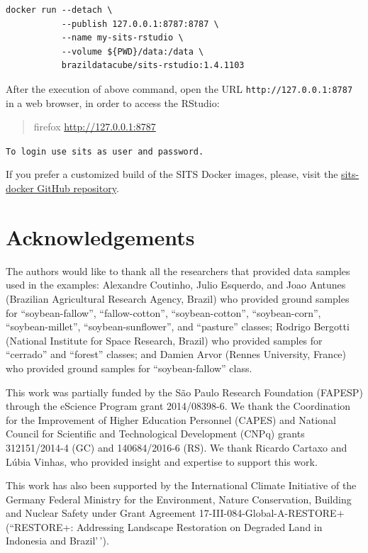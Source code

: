 \documentclass[a4paper,]{tufte-book}
\begin{document}
\begin{verbatim}
docker run --detach \
           --publish 127.0.0.1:8787:8787 \
           --name my-sits-rstudio \
           --volume ${PWD}/data:/data \
           brazildatacube/sits-rstudio:1.4.1103 
\end{verbatim}

After the execution of above command, open the URL \texttt{http://127.0.0.1:8787} in a web browser, in order to access the RStudio:

\begin{quote}
firefox \url{http://127.0.0.1:8787}
\end{quote}

\texttt{To\ login\ use\ \textquotesingle{}sits\textquotesingle{}\ as\ user\ and\ password.}

If you prefer a customized build of the SITS Docker images, please, visit the \href{https://github.com/e-sensing/sits}{sits-docker GitHub repository}.

\hypertarget{acknowledgements}{%
\chapter*{Acknowledgements}\label{acknowledgements}}
\addcontentsline{toc}{chapter}{Acknowledgements}

The authors would like to thank all the researchers that provided data samples used in the examples: Alexandre Coutinho, Julio Esquerdo, and Joao Antunes (Brazilian Agricultural Research Agency, Brazil) who provided ground samples for ``soybean-fallow'', ``fallow-cotton'', ``soybean-cotton'', ``soybean-corn'', ``soybean-millet'', ``soybean-sunflower'', and ``pasture'' classes; Rodrigo Bergotti (National Institute for Space Research, Brazil) who provided samples for ``cerrado'' and ``forest'' classes; and Damien Arvor (Rennes University, France) who provided ground samples for ``soybean-fallow'' class.

This work was partially funded by the São Paulo Research Foundation (FAPESP) through the eScience Program grant 2014/08398-6. We thank the Coordination for the Improvement of Higher Education Personnel (CAPES) and National Council for Scientific and Technological Development (CNPq) grants 312151/2014-4 (GC) and 140684/2016-6 (RS). We thank Ricardo Cartaxo and Lúbia Vinhas, who provided insight and expertise to support this work.

This work has also been supported by the International Climate Initiative of the Germany Federal Ministry for the Environment, Nature Conservation, Building and Nuclear Safety under Grant Agreement 17-III-084-Global-A-RESTORE+ (``RESTORE+: Addressing Landscape Restoration on Degraded Land in Indonesia and Brazil'\,').
\end{document}
